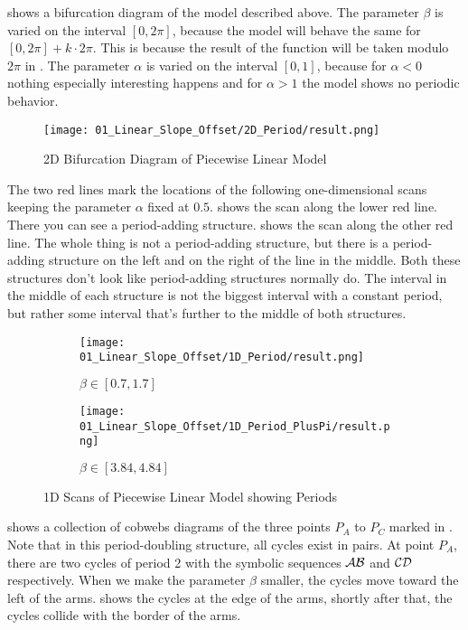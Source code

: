  shows a bifurcation diagram of the model described above.
The parameter $\beta$ is varied on the interval $[0, 2 \pi]$, because the model will behave the same for $[0, 2 \pi] + k \cdot 2 \pi$.
This is because the result of the function will be taken modulo $2 \pi$ in .
The parameter $\alpha$ is varied on the interval $[0, 1]$, because for $\alpha < 0$ nothing especially interesting happens and for $\alpha > 1$ the model shows no periodic behavior.

\begin{figure}
    \centering
    \texttt{[image: 01\_Linear\_Slope\_Offset/2D\_Period/result.png]}
    \caption{2D Bifurcation Diagram of Piecewise Linear Model}
    \label{fig:pcw.lin.2d}
\end{figure}

The two red lines mark the locations of the following one-dimensional scans keeping the parameter $\alpha$ fixed at $0.5$.
 shows the scan along the lower red line.
There you can see a period-adding structure.
 shows the scan along the other red line.
The whole thing is not a period-adding structure, but there is a period-adding structure on the left and on the right of the line in the middle.
Both these structures don't look like period-adding structures normally do.
The interval in the middle of each structure is not the biggest interval with a constant period, but rather some interval that's further to the middle of both structures.

\begin{figure}
    \centering
    \begin{subfigure}{0.4\textwidth}
        \centering
        \texttt{[image: 01\_Linear\_Slope\_Offset/1D\_Period/result.png]}
        \caption{$\beta \in [0.7, 1.7]$}
        \label{fig:pcw.lin.1D}
    \end{subfigure}
    \begin{subfigure}{0.4\textwidth}
        \centering
        \texttt{[image: 01\_Linear\_Slope\_Offset/1D\_Period\_PlusPi/result.png]}
        \caption{$\beta \in [3.84, 4.84]$}
        \label{fig:pcw.lin.1DPlusPi}
    \end{subfigure}
    \caption{1D Scans of Piecewise Linear Model showing Periods}
\end{figure}


 shows a collection of cobwebs diagrams of the three points $P_A$ to $P_C$ marked in .
Note that in this period-doubling structure, all cycles exist in pairs.
At point $P_A$, there are two cycles of period 2 with the symbolic sequences $\mathcal{A}\mathcal{B}$ and $\mathcal{C}\mathcal{D}$ respectively.
When we make the parameter $\beta$ smaller, the cycles move toward the left of the arms.
 shows the cycles at the edge of the arms, shortly after that, the cycles collide with the border of the arms.

